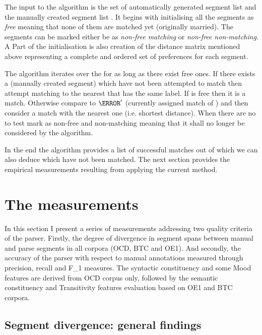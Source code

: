 The input to the algorithm is the set of automatically generated segment list \aslist and the manually created segment list \mslist.  It begins with initialising all the segments as \textit{free} meaning that none of them are matched yet (originally married). The segments can be marked either be as \textit{non-free matching} or \textit{non-free non-matching}. A Part of the initialisation is also creation of the distance matrix mentioned above representing a complete and ordered set of preferences for each segment. 

The algorithm iterates over the \aslist for as long as there exist free ones. If there exists a \ms (manually created segment) which have not been attempted to match \as then attempt matching \as to the nearest \ms that has the same label. If \ms is free then it is a match. Otherwise compare \as to $\as'$ (currently assigned match of \ms) and then consider a match with the nearest one (i.e. shortest distance). When there are no \mslist to test mark \as as non-free and non-matching meaning that it shall no longer be considered by the algorithm.

In the end the algorithm provides a list of successful matches out of which we can also deduce which \aslist \mslist have not been matched. The next section provides the empirical measurements resulting from applying the current method. 

\section{The measurements}
\label{sec:results}

In this section I present a series of measurements addressing two quality criteria of the parser. Firstly, the degree of divergence in segment spans between manual and parse segments in all corpora (OCD, BTC and OE1). And secondly, the accuracy of the parser with respect to manual annotations measured through precision, recall and F_1 measures. The syntactic constituency and some Mood features are derived from OCD corpus only, followed by the semantic constituency and Transitivity features evaluation based on OE1 and BTC corpora. 

\subsection{Segment divergence: general findings}

